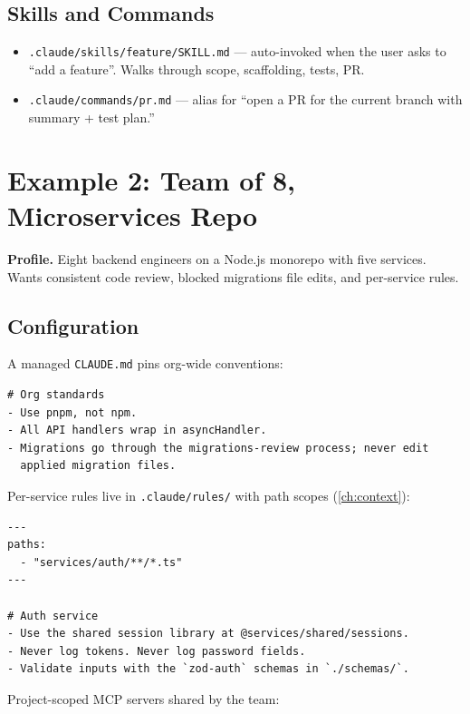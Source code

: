 \subsection{Skills and Commands}

\begin{itemize}
  \item \texttt{.claude/skills/feature/SKILL.md} — auto-invoked when the
        user asks to ``add a feature''. Walks through scope, scaffolding,
        tests, PR.
  \item \texttt{.claude/commands/pr.md} — alias for ``open a PR for the
        current branch with summary + test plan.''
\end{itemize}

\section{Example 2: Team of 8, Microservices Repo}
\label{sec:ex-team}

\textbf{Profile.} Eight backend engineers on a Node.js monorepo with five
services. Wants consistent code review, blocked migrations file edits,
and per-service rules.

\subsection{Configuration}

A managed \texttt{CLAUDE.md} pins org-wide conventions:

\begin{lstlisting}[caption={Managed \texttt{CLAUDE.md} (e.g.\ \texttt{/etc/claude-code/CLAUDE.md} on Linux)}]
# Org standards
- Use pnpm, not npm.
- All API handlers wrap in asyncHandler.
- Migrations go through the migrations-review process; never edit
  applied migration files.
\end{lstlisting}

Per-service rules live in \texttt{.claude/rules/} with path scopes
(\cref{ch:context}):

\begin{lstlisting}[caption={\texttt{.claude/rules/auth-service.md}}]
---
paths:
  - "services/auth/**/*.ts"
---

# Auth service
- Use the shared session library at @services/shared/sessions.
- Never log tokens. Never log password fields.
- Validate inputs with the `zod-auth` schemas in `./schemas/`.
\end{lstlisting}

Project-scoped MCP servers shared by the team:

